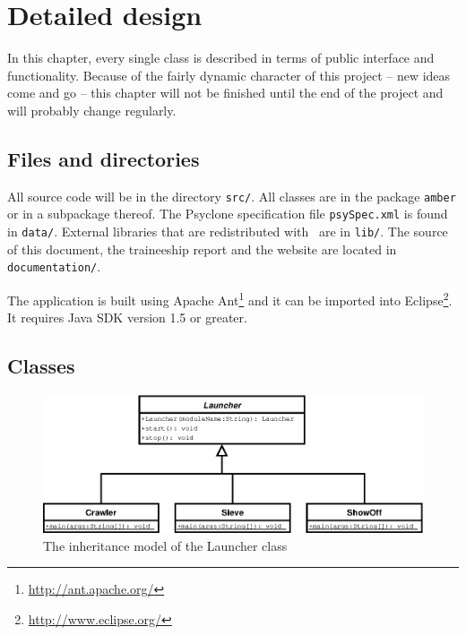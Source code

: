\chapter{Detailed design}

In this chapter, every single class is described in terms of public interface
and functionality. Because of the fairly dynamic character of this project --
new ideas come and go -- this chapter will not be finished until the end of the
project and will probably change regularly.

\section{Files and directories}

All source code will be in the directory \texttt{src/}. All classes are in the
package \texttt{amber} or in a subpackage thereof. The Psyclone specification
file \texttt{psySpec.xml} is found in \texttt{data/}. External libraries that
are redistributed with \Amber\ are in \texttt{lib/}. The source of this
document, the traineeship report and the website are located in
\texttt{documentation/}.

The application is built using Apache
Ant\footnote{\url{http://ant.apache.org/}} and it can be imported into
Eclipse\footnote{\url{http://www.eclipse.org/}}. It requires Java SDK version
1.5 or greater.

\section{Classes}

\begin{figure}[htp]
  \centering
  \includegraphics{image/class-diagram-launcher}
  \caption{The inheritance model of the Launcher class}
  \label{fig:class-diagram-launcher}
\end{figure}

